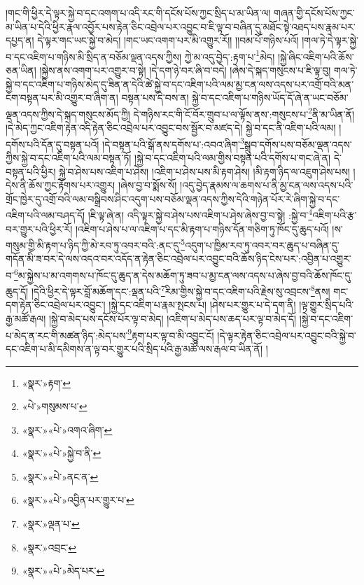 །གང་གི་ཕྱིར་དེ་ལྟར་སྐྱེ་བ་དང་འགག་པ་འདི་རང་གི་དངོས་པོས་ཀྱང་སྲིད་པ་མ་ཡིན་ལ། གཞན་གྱི་དངོས་པོས་ཀྱང་མ་ཡིན་པ་དེའི་ཕྱིར་རྣལ་འབྱོར་པས་རྟེན་ཅིང་འབྲེལ་པར་འབྱུང་བ་ཇི་ལྟ་བ་བཞིན་དུ་མཐོང་སྟེ་འཐད་པས་རྣམ་པར་དཔྱད་ན། དེ་ལྟར་གང་ཡང་སྐྱེ་བ་མེད། །གང་ཡང་འགག་པར་མི་འགྱུར་རོ།། །།བམ་པོ་གཉིས་པའོ། །གལ་ཏེ་དེ་ལྟར་སྐྱེ་བ་དང་འཇིག་པ་གཉིས་མི་སྲིད་ན་བཅོམ་ལྡན་འདས་ཀྱིས། ཀྱེ་མ་འདུ་བྱེད་:རྟག་པ་\footnote{«སྣར་»རྟག་}མེད། །སྐྱེ་ཞིང་འཇིག་པའི་ཆོས་ཅན་ཡིན། །སྐྱེས་ནས་འགག་པར་འགྱུར་བ་སྟེ། །དེ་དག་ཉེ་བར་ཞི་བ་བདེ། །ཞེས་དེ་སྐད་གསུངས་པ་ཇི་ལྟ་བུ། གལ་ཏེ་སྐྱེ་བ་དང་འཇིག་པ་གཉིས་མེད་དུ་ཟིན་ན་དེའི་ཚེ་སྐྱེ་བ་དང་འཇིག་པའི་ལམ་མྱ་ངན་ལས་འདས་པར་འགྲོ་བའི་མན་ངག་བསྟན་པར་མི་འགྱུར་བ་ཞིག་ན། བསྟན་པས་དེ་བས་ན། སྐྱེ་བ་དང་འཇིག་པ་གཉིས་ཡོད་དོ་ཞེ་ན་ཡང་བཅོམ་ལྡན་འདས་ཀྱིས་དེ་སྐད་གསུངས་མོད་ཀྱི། དེ་གཉིས་རང་གི་ངོ་བོར་གྲུབ་པ་ལ་ལྟོས་ནས་:གསུངས་པ་\footnote{«པེ་»གསུམས་པ་}ནི་མ་ཡིན་ནོ། །དེ་མེད་ཀྱང་འཇིག་རྟེན་འདི་རྟེན་ཅིང་འབྲེལ་པར་འབྱུང་བས་སྦྱོར་བ་མཛད་དེ། སྐྱེ་བ་དང་ནི་འཇིག་པའི་ལམ། །དགོས་པའི་དོན་དུ་བསྟན་པའོ། །དེ་བསྟན་པའི་སྒོ་ནས་དགོས་པ་:འབའ་ཞིག་\footnote{«སྣར་»«པེ་»འགའ་ཞིག་}སྒྲུབ་དགོས་པས་བཅོམ་ལྡན་འདས་ཀྱིས་སྐྱེ་བ་དང་འཇིག་པའི་ལམ་བསྟན་ཏོ། །སྐྱེ་བ་དང་འཇིག་པའི་ལམ་གྱིས་བསྟན་པའི་དགོས་པ་གང་ཞེ་ན། དེ་བསྟན་པའི་ཕྱིར། སྐྱེ་བ་ཤེས་པས་འཇིག་པ་ཤེས། །འཇིག་པ་ཤེས་པས་མི་རྟག་ཤེས། །མི་རྟག་ཉིད་ལ་འཇུག་ཤེས་པས། །དེས་ནི་ཆོས་ཀྱང་རྟོགས་པར་འགྱུར། །ཞེས་བྱ་བ་སྨོས་སོ། །འདུ་བྱེད་རྣམས་ལ་ཆགས་པ་ནི་མྱ་ངན་ལས་འདས་པའི་གྲོང་ཁྱེར་དུ་འགྲོ་བའི་ལམ་བསྒྲིབས་ཤིང་འདུག་པས་བཅོམ་ལྡན་འདས་ཀྱིས་དེའི་གཉེན་པོར་རེ་ཞིག་སྐྱེ་བ་དང་འཇིག་པའི་ལམ་བཤད་དོ། །ཇི་ལྟ་ཞེ་ན། འདི་ལྟར་སྐྱེ་བ་ཤེས་པས་འཇིག་པ་ཤེས་ཞེས་བྱ་བ་སྟེ། :སྐྱེ་བ་\footnote{«སྣར་»«པེ་»སྐྱེ་བ་ནི་}འཇིག་པའི་རྩ་བར་གྱུར་པའི་ཕྱིར་རོ། །འཇིག་པ་ཤེས་པ་ལ་འཇིག་པ་དང་མི་རྟག་པ་གཉིས་དོན་གཅིག་ཏུ་ཁོང་དུ་ཆུད་པའོ། །ས་གསུམ་གྱི་མི་རྟག་པ་ཉིད་ཀྱི་མེ་རབ་ཏུ་འབར་བའི་:ནང་དུ་\footnote{«སྣར་»«པེ་»ནང་ན་}འདུག་པ་ཁྱིམ་རབ་ཏུ་འབར་བར་ཆུད་པ་བཞིན་དུ་གདོན་མི་ཟ་བར་དེ་ལས་འདའ་བར་འདོད་ན་རྟེན་ཅིང་འབྲེལ་པར་འབྱུང་བའི་ཆོས་ཉིད་ངེས་པར་:འབྱིན་པ་འགྱུར་བ་\footnote{«སྣར་»«པེ་»འབྱིན་པར་གྱུར་པ་}མ་སྐྱེས་པ་མ་འགགས་པ་ཁོང་དུ་ཆུད་ན་དེས་མཆོག་ཏུ་ཟབ་པ་མྱ་ངན་ལས་འདས་པ་ཞེས་བྱ་བའི་ཆོས་ཁོང་དུ་ཆུད་དོ། །དེའི་ཕྱིར་དེ་ལྟར་བློ་མཆོག་དང་:ལྡན་པའི་\footnote{«སྣར་»ལྡན་པ་}རིམ་གྱིས་སྐྱེ་བ་དང་འཇིག་པའི་རྗེས་སུ་འབྲངས་\footnote{«སྣར་»འབྲང་}ནས། གང་དག་རྟེན་ཅིང་འབྲེལ་པར་འབྱུང་། །སྐྱེ་དང་འཇིག་པ་རྣམ་སྤངས་པ། །ཤེས་པར་གྱུར་པ་དེ་དག་ནི། །ལྟ་གྱུར་སྲིད་པའི་རྒྱ་མཚོ་རྒལ། །སྐྱེ་བ་མེད་པས་དངོས་པོར་ལྟ་བ་མེད། །འཇིག་པ་མེད་པས་ཆད་པར་ལྟ་བ་མེད་དོ། །སྐྱེ་བ་དང་འཇིག་པ་མེད་ན་རང་གི་མཚན་ཉིད་:མེད་པས་\footnote{«སྣར་»«པེ་»མེད་པར་}རྟག་པར་ལྟ་བ་མི་འབྱུང་ངོ། །དེ་ལྟར་རྟེན་ཅིང་འབྲེལ་པར་འབྱུང་བའི་སྐྱེ་བ་དང་འཇིག་པ་མི་དམིགས་ན་ལྟ་བར་གྱུར་པའི་སྲིད་པའི་རྒྱ་མཚོ་ལས་རྒལ་བ་ཡིན་ནོ། །
